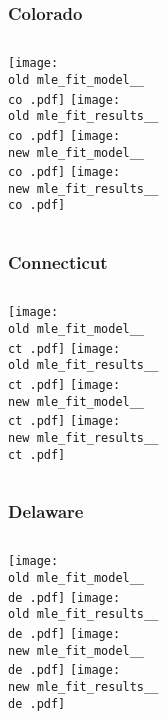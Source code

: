 \documentclass{beamer}
\newcommand{\old}{api-370-prod/pyseir/state_summaries/reports/}
\newcommand{\new}{new/pyseir/state_summaries/reports/}
\newcommand{\co}{Colorado__08}
\newcommand{\ct}{Connecticut__09}
\newcommand{\de}{Delaware__10}
\begin{document}
\begin{frame}
\frametitle{Colorado}
    \begin{columns}[t]

       \texttt{[image: \\old mle\_fit\_model\_\_\\co .pdf]}
       \texttt{[image: \\old mle\_fit\_results\_\_\\co .pdf]}   
       \texttt{[image: \\new mle\_fit\_model\_\_\\co .pdf]}
       \texttt{[image: \\new mle\_fit\_results\_\_\\co .pdf]}   
       
\end{columns}
\end{frame}

\begin{frame}
\frametitle{Connecticut}
    \begin{columns}[t]

       \texttt{[image: \\old mle\_fit\_model\_\_\\ct .pdf]}
       \texttt{[image: \\old mle\_fit\_results\_\_\\ct .pdf]}   
       \texttt{[image: \\new mle\_fit\_model\_\_\\ct .pdf]}
       \texttt{[image: \\new mle\_fit\_results\_\_\\ct .pdf]}   
       
\end{columns}
\end{frame}

\begin{frame}
\frametitle{Delaware}
    \begin{columns}[t]

       \texttt{[image: \\old mle\_fit\_model\_\_\\de .pdf]}
       \texttt{[image: \\old mle\_fit\_results\_\_\\de .pdf]}   
       \texttt{[image: \\new mle\_fit\_model\_\_\\de .pdf]}
       \texttt{[image: \\new mle\_fit\_results\_\_\\de .pdf]}   
       
\end{columns}
\end{frame}
\end{document}
